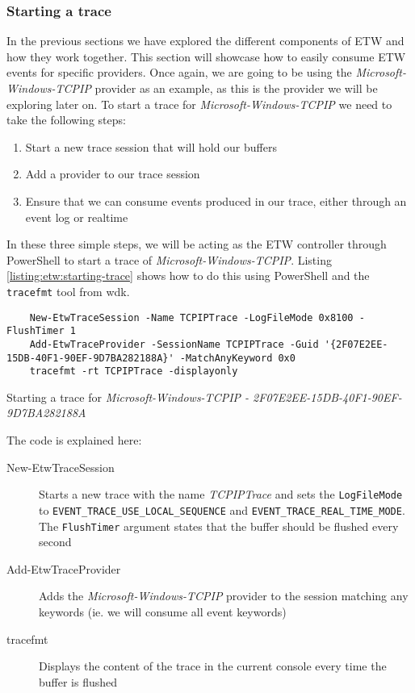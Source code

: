 \documentclass{report}
\begin{document}
\subsubsection{Starting a trace}
In the previous sections we have explored the different components of \gls{ETW} and how they work together. This section will showcase how to easily consume \gls{ETW} events for specific providers. Once again, we are going to be using the \emph{Microsoft-Windows-TCPIP} provider as an example, as this is the provider we will be exploring later on. To start a trace for \emph{Microsoft-Windows-TCPIP} we need to take the following steps:

\begin{enumerate}
    \item Start a new trace session that will hold our buffers
    \item Add a provider to our trace session
    \item Ensure that we can consume events produced in our trace, either through an event log or realtime
\end{enumerate}

In these three simple steps, we will be acting as the \gls{ETW} controller through PowerShell to start a trace of \emph{Microsoft-Windows-TCPIP}. Listing \ref{listing:etw:starting-trace} shows how to do this using PowerShell and the \texttt{tracefmt} tool from \gls{wdk}.

\begin{listing}
\begin{verbatim}
    New-EtwTraceSession -Name TCPIPTrace -LogFileMode 0x8100 -FlushTimer 1
    Add-EtwTraceProvider -SessionName TCPIPTrace -Guid '{2F07E2EE-15DB-40F1-90EF-9D7BA282188A}' -MatchAnyKeyword 0x0
    tracefmt -rt TCPIPTrace -displayonly
\end{verbatim}
\caption{Starting a trace for \emph{Microsoft-Windows-TCPIP - 2F07E2EE-15DB-40F1-90EF-9D7BA282188A}}
\label{listing:etw:starting-trace}
\end{listing}

The code is explained here:
\begin{description}
    \item[New-EtwTraceSession] Starts a new trace with the name \emph{TCPIPTrace} and sets the \texttt{LogFileMode} to \texttt{EVENT_TRACE_USE_LOCAL_SEQUENCE} and \texttt{EVENT_TRACE_REAL_TIME_MODE}\cite{url:etw:trace:logging-mode-constants}. The \texttt{FlushTimer} argument states that the buffer should be flushed every second
    \item[Add-EtwTraceProvider] Adds the \emph{Microsoft-Windows-TCPIP} provider to the session matching any keywords (ie. we will consume all event keywords)
    \item[tracefmt] Displays the content of the trace in the current console every time the buffer is flushed
\end{description}
\end{document}
